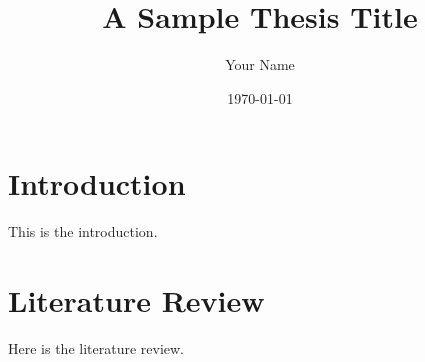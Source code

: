 \documentclass[12pt]{report}
\begin{document}
\title{A Sample Thesis Title}
\author{Your Name}
\date{\today}
\maketitle
\chapter{Introduction}
This is the introduction.
\chapter{Literature Review}
Here is the literature review.
\end{document}
